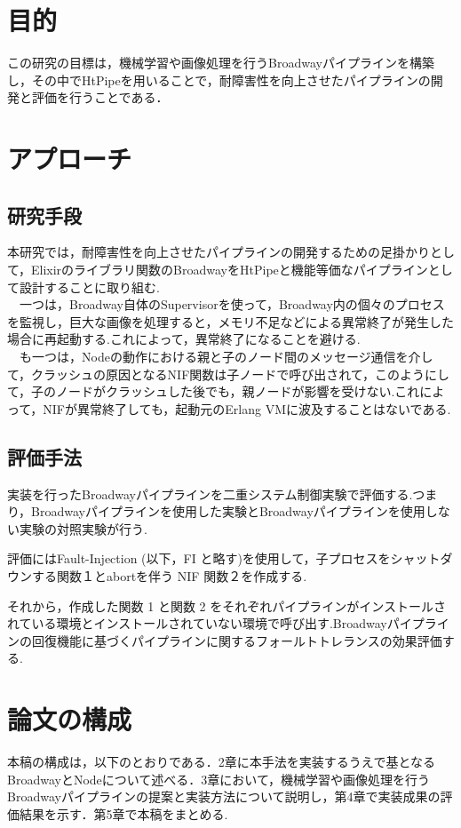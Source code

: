 \documentclass[a4paper]{jreport}	%
\begin{document}
\section{目的}
この研究の目標は，機械学習や画像処理を行うBroadwayパイプラインを構築し，その中でHtPipeを用いることで，耐障害性を向上させたパイプラインの開発と評価を行うことである．
\section{アプローチ}
\subsection{研究手段}
本研究では，耐障害性を向上させたパイプラインの開発するための足掛かりとして，Elixirのライブラリ関数のBroadwayをHtPipeと機能等価なパイプラインとして設計することに取り組む.
\\　一つは，Broadway自体のSupervisorを使って，Broadway内の個々のプロセスを監視し，巨大な画像を処理すると，メモリ不足などによる異常終了が発生した場合に再起動する.これによって，異常終了になることを避ける.
\\　も一つは，Nodeの動作における親と子のノード間のメッセージ通信を介して，クラッシュの原因となるNIF関数は子ノードで呼び出されて，このようにして，子のノードがクラッシュした後でも，親ノードが影響を受けない.これによって，NIFが異常終了しても，起動元のErlang VMに波及することはないである.
\subsection{評価手法}
実装を行ったBroadwayパイプラインを二重システム制御実験で評価する.つまり，Broadwayパイプラインを使用した実験とBroadwayパイプラインを使用しない実験の対照実験が行う.

評価にはFault-Injection (以下，FI と略す)を使用して，子プロセスをシャットダウンする関数１とabortを伴う NIF 関数２を作成する.

それから，作成した関数 1 と関数 2 をそれぞれパイプラインがインストールされている環境とインストールされていない環境で呼び出す.Broadwayパイプラインの回復機能に基づくパイプラインに関するフォールトトレランスの効果評価する.

\section{論文の構成}
本稿の構成は，以下のとおりである．2章に本手法を実装するうえで基となるBroadwayとNodeについて述べる．3章において，機械学習や画像処理を行うBroadwayパイプラインの提案と実装方法について説明し，第4章で実装成果の評価結果を示す．第5章で本稿をまとめる.
\end{document}
